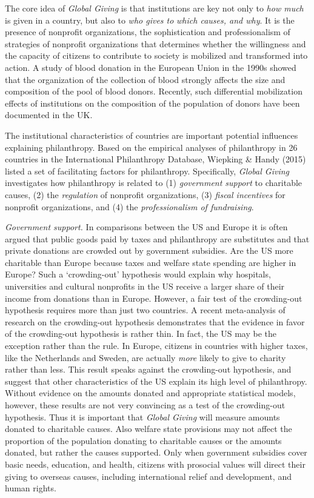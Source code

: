 \documentclass[twocolumn, serif, rga, numeric]{jote-article}
\begin{document}
The core idea of \emph{Global Giving} is that institutions are key not only to \emph{how much} is given in a country, but also to \emph{who gives to} \emph{which causes, and why}. It is the presence of nonprofit organizations, the sophistication and professionalism of strategies of nonprofit organizations that determines whether the willingness and the capacity of citizens to contribute to society is mobilized and transformed into action. A study of blood donation in the European Union in the 1990s showed that the organization of the collection of blood strongly affects the size and composition of the pool of blood donors.\cite{Healy2000} Recently, such differential mobilization effects of institutions on the composition of the population of donors have been documented in the UK.\cite{Mohan2016}

The institutional characteristics of countries are important potential influences explaining philanthropy. Based on the empirical analyses of philanthropy in 26 countries in the International Philanthropy Database, Wiepking \& Handy (2015)\cite{Wiepking2015} listed a set of facilitating factors for philanthropy. Specifically, \emph{Global Giving} investigates how philanthropy is related to (1) \emph{government support} to charitable causes, (2) the \emph{regulation} of nonprofit organizations, (3) \emph{fiscal incentives} for nonprofit organizations, and (4) the \emph{professionalism of fundraising}.

\emph{Government support.} In comparisons between the US and Europe it is often argued that public goods paid by taxes and philanthropy are substitutes and that private donations are crowded out by government subsidies. Are the US more charitable than Europe because taxes and welfare state spending are higher in Europe? Such a `crowding-out' hypothesis would explain why hospitals, universities and cultural nonprofits in the US receive a larger share of their income from donations than in Europe. However, a fair test of the crowding-out hypothesis requires more than just two countries. A recent meta-analysis of research on the crowding-out hypothesis demonstrates that the evidence in favor of the crowding-out hypothesis is rather thin.\cite{DeWit2016} In fact, the US may be the exception rather than the rule. In Europe, citizens in countries with higher taxes, like the Netherlands and Sweden, are actually \emph{more} likely to give to charity rather than less.\cite{Bekkers2015a} This result speaks against the crowding-out hypothesis, and suggest that other characteristics of the US explain its high level of philanthropy.
Without evidence on the amounts donated and appropriate statistical models, however, these results are not very convincing as a test of the crowding-out hypothesis. Thus it is important that \emph{Global Giving}
will measure amounts donated to charitable causes. Also welfare state provisions may not affect the proportion of the population donating to charitable causes or the amounts donated, but rather the causes supported. Only when government subsidies cover basic needs, education, and health, citizens with prosocial values will direct their giving to overseas causes, including international relief and development, and human rights.\cite{Inglehart1977, Wiepking2010}
\end{document}
